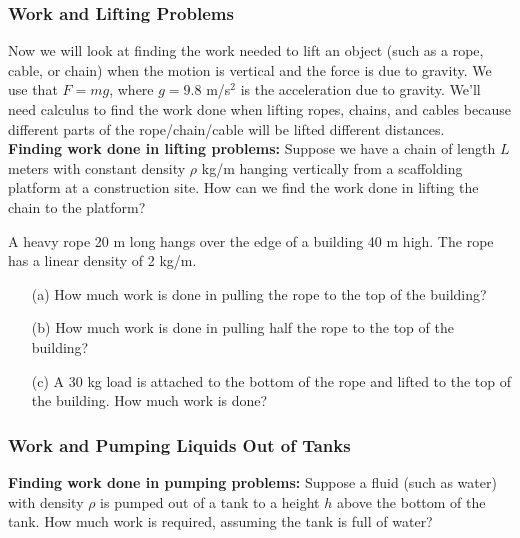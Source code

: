 \documentclass[12pt]{article}
\begin{document}
\subsubsection*{Work and Lifting Problems}

Now we will look at finding the work needed to lift an object (such as a rope, cable, or chain) when the motion is vertical and the force is due to gravity. We use that $F=mg$, where $g=9.8$ m/s$^2$ is the acceleration due to gravity. We'll need calculus to find the work done when lifting ropes, chains, and cables because different parts of the rope/chain/cable will be lifted different distances.\\

\textbf{Finding work done in lifting problems:} Suppose we have a chain of length $L$ meters with constant density $\rho$ kg/m hanging vertically from a scaffolding platform at a construction site. How can we find the work done in lifting the chain to the platform?

\newpage 

\Example A heavy rope 20 m long hangs over the edge of a building 40 m high. The rope has a linear density of 2 kg/m.

\begin{itemize}

\item[(a)] How much work is done in pulling the rope to the top of the building?

\vfill

\item[(b)] How much work is done in pulling half the rope to the top of the building?

\vfill 

\item[(c)] A 30 kg load is attached to the bottom of the rope and lifted to the top of the building. How much work is done?

\vfill 

\end{itemize}

\newpage

\subsubsection*{Work and Pumping Liquids Out of Tanks}

\textbf{Finding work done in pumping problems:} Suppose a fluid (such as water) with density $\rho$ is pumped out of a tank to a height $h$ above the bottom of the tank. How much work is required, assuming the tank is full of water?
\end{document}
